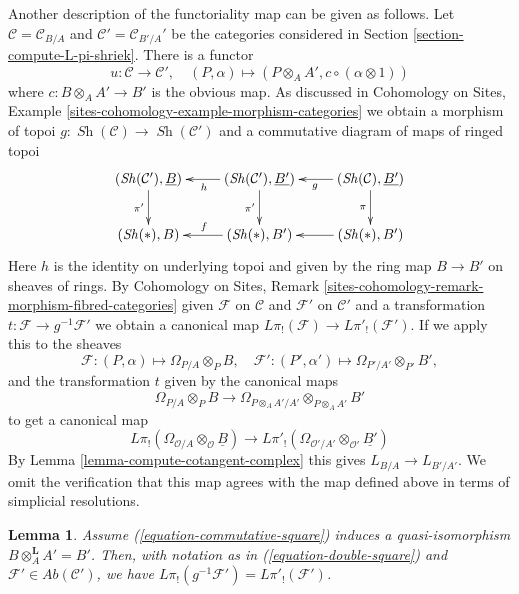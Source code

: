 \documentclass{stacks-project}
\theoremstyle{plain}
\newtheorem{lemma}[subsection]{Lemma}
\theoremstyle{definition}
\theoremstyle{remark}
\numberwithin{equation}{subsection}
\def\Sh{\mathop{\mathit{Sh}}\nolimits}
\begin{document}
\medskip\noindent
Another description of the functoriality map can be given as follows.
Let $\mathcal{C} = \mathcal{C}_{B/A}$ and $\mathcal{C}' = \mathcal{C}_{B'/A}'$
be the categories considered in Section \ref{section-compute-L-pi-shriek}.
There is a functor
$$
u : \mathcal{C} \longrightarrow \mathcal{C}',\quad
(P, \alpha) \longmapsto (P \otimes_A A', c \circ (\alpha \otimes 1))
$$
where $c : B \otimes_A A' \to B'$ is the obvious map. As discussed in
Cohomology on Sites, Example
\ref{sites-cohomology-example-morphism-categories}
we obtain a morphism of topoi $g : \Sh(\mathcal{C}) \to \Sh(\mathcal{C}')$
and a commutative diagram of maps of ringed topoi
\begin{equation}
\label{equation-double-square}
\vcenter{
\xymatrix{
(\Sh(\mathcal{C}'), \underline{B}) \ar[d]_{\pi'} &
(\Sh(\mathcal{C}'), \underline{B'}) \ar[d]_{\pi'} \ar[l]^h &
(\Sh(\mathcal{C}), \underline{B'}) \ar[d]_\pi \ar[l]^g \\
(\Sh(*), B) &
(\Sh(*), B') \ar[l]_f &
(\Sh(*), B') \ar[l]
}
}
\end{equation}
Here $h$ is the identity on underlying topoi and given by the ring map
$B \to B'$ on sheaves of rings. 
By Cohomology on Sites, Remark
\ref{sites-cohomology-remark-morphism-fibred-categories}
given $\mathcal{F}$ on $\mathcal{C}$ and $\mathcal{F}'$ on $\mathcal{C}'$
and a transformation $t : \mathcal{F} \to g^{-1}\mathcal{F}'$
we obtain a canonical map $L\pi_!(\mathcal{F}) \to L\pi'_!(\mathcal{F}')$.
If we apply this to the sheaves
$$
\mathcal{F} : (P, \alpha) \mapsto \Omega_{P/A} \otimes_P B,\quad
\mathcal{F}' : (P', \alpha') \mapsto \Omega_{P'/A'} \otimes_{P'} B',
$$
and the transformation $t$ given by the canonical maps
$$
\Omega_{P/A} \otimes_P B \longrightarrow
\Omega_{P \otimes_A A'/A'} \otimes_{P \otimes_A A'} B'
$$
to get a canonical map
$$
L\pi_!(\Omega_{\mathcal{O}/A} \otimes_\mathcal{O} \underline{B})
\longrightarrow
L\pi'_!(\Omega_{\mathcal{O}'/A'} \otimes_{\mathcal{O}'} \underline{B'})
$$
By Lemma \ref{lemma-compute-cotangent-complex} this gives
$L_{B/A} \to L_{B'/A'}$. We omit the verification that this map
agrees with the map defined above in terms of simplicial
resolutions.

\begin{lemma}
\label{lemma-flat-base-change}
Assume (\ref{equation-commutative-square}) induces a quasi-isomorphism
$B \otimes_A^\mathbf{L} A' = B'$. Then, with notation as in
(\ref{equation-double-square}) and
$\mathcal{F}' \in \textit{Ab}(\mathcal{C}')$,
we have $L\pi_!(g^{-1}\mathcal{F}') = L\pi'_!(\mathcal{F}')$.
\end{lemma}
\end{document}

